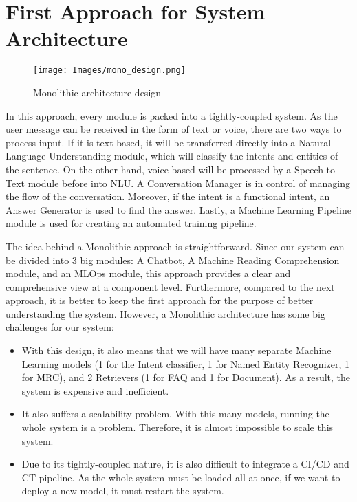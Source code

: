 \chapter{First Approach for System Architecture}

\begin{figure}[h]
\begin{center}
\texttt{[image: Images/mono\_design.png]}
\end{center}
\caption{Monolithic architecture design}
\end{figure}
In this approach, every module is packed into a tightly-coupled system. As the user message can be received in the form of text or voice, there are two ways to process input. If it is text-based, it will be transferred directly into a Natural Language Understanding module, which will classify the intents and entities of the sentence. On the other hand, voice-based will be processed by a Speech-to-Text module before into NLU. A Conversation Manager is in control of managing the flow of the conversation. Moreover, if the intent is a functional intent, an Answer Generator is used to find the answer. Lastly, a Machine Learning Pipeline module is used for creating an automated training pipeline.

The idea behind a Monolithic approach is straightforward. Since our system can be divided into 3 big modules: A Chatbot, A Machine Reading Comprehension module, and an MLOps module, this approach provides a clear and comprehensive view at a component level. Furthermore, compared to the next approach, it is better to keep the first approach for the purpose of better understanding the system. However, a Monolithic architecture has some big challenges for our system:
\begin{itemize}
    \item With this design, it also means that we will have many separate Machine Learning models (1 for the Intent classifier, 1 for Named Entity Recognizer, 1 for MRC), and 2 Retrievers (1 for FAQ and 1 for Document). As a result, the system is expensive and inefficient.
    \item It also suffers a scalability problem. With this many models, running the whole system is a problem. Therefore, it is almost impossible to scale this system.
    \item Due to its tightly-coupled nature, it is also difficult to integrate a CI/CD and CT pipeline. As the whole system must be loaded all at once, if we want to deploy a new model, it must restart the system.
\end{itemize}



